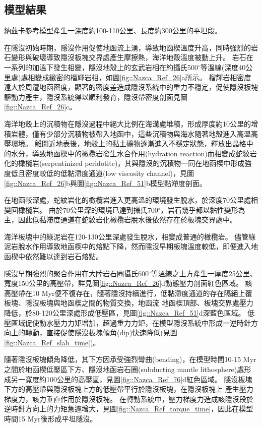 \subsection{模型結果}
納茲卡參考模型產生一深度約100-110公里、長度約300公里的平坦段。

在隱沒初始時期，隱沒作用促使地函流上湧，導致地函楔溫度升高，同時強烈的岩石變形與破壞導致隱沒板塊交界處產生摩擦熱，海洋地殼溫度被動上升。
岩石在一系列的加溫下發生相變，隱沒地殼上的玄武岩相在約攝氏500$^{\circ}$等溫線(深度40公里處)處相變成緻密的榴輝岩相，如圖\ref{fig::Nazca_Ref_26}a所示。
榴輝岩相密度遠大於周遭地函密度，顯著的密度差造成隱沒系統中的重力不穩定，促使隱沒板塊驅動力產生，隱沒系統得以順利發育，隱沒帶密度剖面見圖\ref{fig::Nazca_Ref_26}c。

海洋地殼上的沉積物在隱沒過程中絕大比例在海溝處堆積，形成厚度約10公里的增積岩體，僅有少部分沉積物被帶入地函中，這些沉積物與海水隨著地殼進入高溫高壓環境。
離開近地表後，地殼上的黏土礦物逐漸進入不穩定狀態，釋放出晶格中的水分，導致地函楔中的橄欖岩發生水合作用(hydration reaction)而相變成蛇紋岩化的橄欖岩(serpentinized peridotite)，其與隱沒的沉積物一同在地函楔中形成強度低且密度較低的低黏滯度通道(low viscosity channel)，見圖\ref{fig::Nazca_Ref_26}b與圖\ref{fig::Nazca_Ref_51}b模型黏滯度剖面。

在地函較深處，蛇紋岩化的橄欖岩進入更高溫的環境發生脫水，於深度70公里處相變回橄欖岩。
由於70公里深的環境已達到攝氏700$^{\circ}$，岩石幾乎都以黏性變形為主，因此低黏滯度通道在蛇紋岩化橄欖岩脫水後依然存在於板塊交界處中。

海洋板塊中的綠泥岩在120-130公里深處發生脫水，相變成普通的橄欖岩。
儘管綠泥岩脫水作用導致地函楔中的熔點下降，然而隱沒早期板塊溫度較低，即便進入地函楔中依然難以達到岩石熔點。

隱沒早期強烈的聚合作用在大陸岩石圈攝氏600$^{\circ}$等溫線之上方產生一厚度25公里、寬度150公里的高壓帶，詳見圖\ref{fig::Nazca_Ref_26}d動態壓力剖面紅色區域。
該高壓帶在10 Myr便不復存在，隨著隱沒持續進行，低黏滯度通道的存在隔絕上覆板塊、隱沒板塊與地函楔之間的物質交換，地函流
地函楔頂部、板塊交界處壓力降低，於80-120公里深處形成低壓區，見圖\ref{fig::Nazca_Ref_51}d深藍色區域。 
低壓區域促使動水壓力力矩增加，超過重力力矩，在模型隱沒系統中形成一逆時針方向上的轉動，直接促使隱沒板塊傾角(dip)快速降低(見圖\ref{fig::Nazca_Ref_slab_time})。

隨著隱沒板塊傾角降低，其下方因承受強烈彎曲(bending)，在模型時間10-15 Myr之間於地函楔低壓區下方、隱沒地函岩石圈(subducting mantle lithosphere)處形成另一寬度約100公里的高壓區，見圖\ref{fig::Nazca_Ref_76}d紅色區域。
隱沒板塊下方的高壓帶與隱沒板塊上方的低壓帶平行於隱沒板塊，在隱沒板塊上
產生壓力梯度力，該力垂直作用於隱沒板塊。
在轉動系統中，壓力梯度力造成該隱沒段於逆時針方向上的力矩急遽增大，見圖\ref{fig::Nazca_Ref_torque_time}，因此在模型時間15 Myr後形成平坦隱沒。

